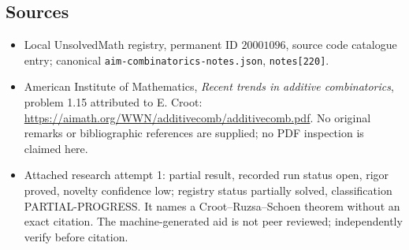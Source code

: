 \documentclass[11pt]{article}
\begin{document}
\subsection{Sources}
\begin{itemize}
\item Local UnsolvedMath registry, permanent ID $20001096$, source code catalogue entry; canonical \texttt{aim-combinatorics-notes.json}, \texttt{notes[220]}.
\item American Institute of Mathematics, \emph{Recent trends in additive combinatorics}, problem 1.15 attributed to E. Croot: \url{https://aimath.org/WWN/additivecomb/additivecomb.pdf}. No original remarks or bibliographic references are supplied; no PDF inspection is claimed here.
\item Attached research attempt 1: partial result, recorded run status open, rigor proved, novelty confidence low; registry status partially solved, classification PARTIAL-PROGRESS. It names a Croot--Ruzsa--Schoen theorem without an exact citation. The machine-generated aid is not peer reviewed; independently verify before citation.
\end{itemize}
\end{document}
